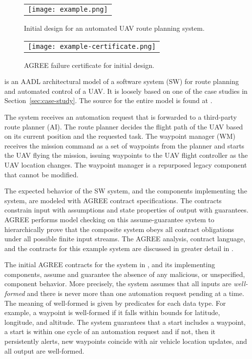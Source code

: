 \begin{figure*}[h]
  \begin{center}
    \begin{tabular}{c}
      \texttt{[image: example.png]}
    \end{tabular}
  \end{center}
\caption{Initial design for an automated UAV route planning system.}
\label{fig:example}
\end{figure*}

\begin{figure}
  \begin{center}
    \begin{tabular}{c}
      \texttt{[image: example-certificate.png]} \\
    \end{tabular}
  \end{center}
\caption{AGREE failure certificate for initial design.}
\label{fig:example-certificate}
\end{figure}

 is an AADL architectural model of a software system (SW) for route planning and automated control of a UAV.
It is loosely based on one of the case studies in Section~\ref{sec:case-study}.
The source for the entire model is found at \cite{repo}.

The system receives an automation request that is forwarded to a third-party route planner (AI).
The route planner decides the flight path of the UAV based on its current position and the requested task.
The waypoint manager (WM) receives the mission command as a set of waypoints from the planner and starts the UAV flying the mission, issuing waypoints to the UAV flight controller as the UAV location changes.
The waypoint manager is a repurposed legacy component that cannot be modified.

The expected behavior of the SW system, and the components implementing the system, are modeled with AGREE contract specifications.
The contracts constrain input with assumptions and state properties of output with guarantees.
AGREE performs model checking on this assume-guarantee system to hierarchically prove that the composite system obeys all contract obligations under all possible finite input streams.
The AGREE analysis, contract language, and the contracts for this example system are discussed in greater detail in .

The initial AGREE contracts for the system in , and its implementing components, assume and guarantee the absence of any malicious, or unspecified, component behavior.
More precisely, the system assumes that all inputs are \emph{well-formed} and there is never more than one automation request pending at a time.
The meaning of well-formed is given by predicates for each data type.
For example, a waypoint is well-formed if it falls within bounds for latitude, longitude, and altitude.
The system guarantees that a start includes a waypoint, a start is within one cycle of an automation request and if not, then it persistently alerts, new waypoints coincide with air vehicle location updates, and all output are well-formed.

